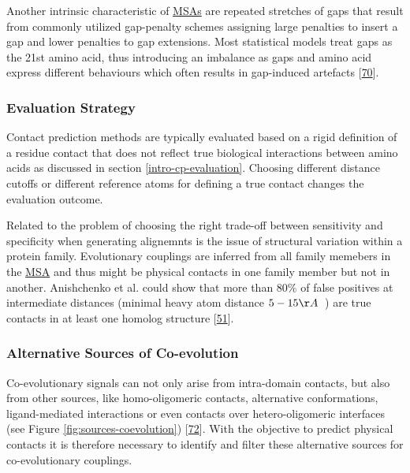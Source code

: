 \documentclass[12pt,a4paper,twoside]{book}
\theoremstyle{definition}
\theoremstyle{definition}
\theoremstyle{remark}
\begin{document}
Another intrinsic characteristic of \protect\hyperlink{abbrev}{MSAs} are
repeated stretches of gaps that result from commonly utilized
gap-penalty schemes assigning large penalties to insert a gap and lower
penalties to gap extensions. Most statistical models treat gaps as the
21st amino acid, thus introducing an imbalance as gaps and amino acid
express different behaviours which often results in gap-induced
artefacts {[}\protect\hyperlink{ref-Feinauer2014}{70}{]}.

\subsubsection*{Evaluation Strategy}\label{evaluation-strategy}

Contact prediction methods are typically evaluated based on a rigid
definition of a residue contact that does not reflect true biological
interactions between amino acids as discussed in section
\ref{intro-cp-evaluation}. Choosing different distance cutoffs or
different reference atoms for defining a true contact changes the
evaluation outcome.

Related to the problem of choosing the right trade-off between
sensitivity and specificity when generating alignemnts is the issue of
structural variation within a protein family. Evolutionary couplings are
inferred from all family memebers in the \protect\hyperlink{abbrev}{MSA}
and thus might be physical contacts in one family member but not in
another. Anishchenko et al. could show that more than \(80\%\) of false
positives at intermediate distances (minimal heavy atom distance
\(5-15 \AA \;\;\)) are true contacts in at least one homolog structure
{[}\protect\hyperlink{ref-Anishchenko2017}{51}{]}.

\subsubsection*{Alternative Sources of
Co-evolution}\label{alternative-sources-of-co-evolution}

Co-evolutionary signals can not only arise from intra-domain contacts,
but also from other sources, like homo-oligomeric contacts, alternative
conformations, ligand-mediated interactions or even contacts over
hetero-oligomeric interfaces (see Figure \ref{fig:sources-coevolution})
{[}\protect\hyperlink{ref-Marks2012}{72}{]}. With the objective to
predict physical contacts it is therefore necessary to identify and
filter these alternative sources for co-evolutionary couplings.
\end{document}
